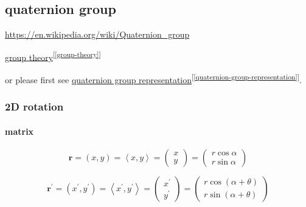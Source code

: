 \documentclass[
]{book}
\theoremstyle{definition}
\theoremstyle{definition}
\theoremstyle{definition}
\theoremstyle{definition}
\theoremstyle{remark}
\begin{document}
\hypertarget{quaternion-group}{%
\subsection{quaternion group}\label{quaternion-group}}

\url{https://en.wikipedia.org/wiki/Quaternion_group}

\protect\hyperlink{group-theory}{group theory}\textsuperscript{{[}\ref{group-theory}{]}}

or please first see \protect\hyperlink{quaternion-group-representation}{quaternion group representation}\textsuperscript{{[}\ref{quaternion-group-representation}{]}}.

\hypertarget{d-rotation}{%
\subsubsection{2D rotation}\label{d-rotation}}

\hypertarget{matrix-1}{%
\paragraph{matrix}\label{matrix-1}}

\[
\boldsymbol{r}=\left(x,y\right)=\left\langle x,y\right\rangle =\begin{pmatrix}x\\
y
\end{pmatrix}=\begin{pmatrix}r\cos\alpha\\
r\sin\alpha
\end{pmatrix}
\]

\[
\boldsymbol{r}^{\prime}=\left(x^{\prime},y^{\prime}\right)=\left\langle x^{\prime},y^{\prime}\right\rangle =\begin{pmatrix}x^{\prime}\\
y^{\prime}
\end{pmatrix}=\begin{pmatrix}r\cos\left(\alpha+\theta\right)\\
r\sin\left(\alpha+\theta\right)
\end{pmatrix}
\]
\end{document}
